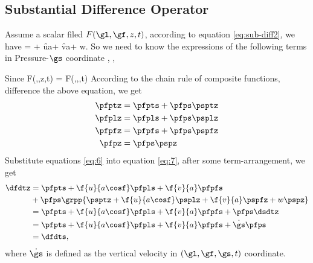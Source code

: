 \subsection{Substantial Difference Operator} \label{der:ddt-sig}

Assume a scalar filed $F(\gl,\gf,z,t)$, according to equation
\ref{eq:sub-diff2}, we have
\beeq \label{eq:7}
\dfdtz = \pfptz + \f{u}{a\cosf}\pfplz + \f{v}{a}\pfpfz + w\pfpz.
\eneq
So we need to know the expressions of the following terms in Pressure-$\gs$
coordinate
\beeq
  \pfptz, \pfplz, \pfpfz
\eneq

Since
\beeq
F(\gl,\gf,z,t) = F(\gl,\gf,\gs,t)
\eneq
According to the chain rule of composite functions, difference the above
equation, we get
\bese
\begin{align} \label{eq:6}
\pfptz &= \pfpts + \pfps\psptz\\
\pfplz &= \pfpls + \pfps\psplz\\
\pfpfz &= \pfpfs + \pfps\pspfz\\
 \pfpz &= \pfps \pspz
\end{align}
\ense
Substitute equations \ref{eq:6} into equation \ref{eq:7}, after some term-arrangement, we get
\begin{align}
  \dfdtz &= \pfpts + \f{u}{a\cosf}\pfpls + \f{v}{a}\pfpfs \nonumber\\
         & + \pfps \grpp{ \psptz + \f{u}{a\cosf}\psplz + \f{v}{a}\pspfz + w\pspz
}\nonumber\\
         &= \pfpts + \f{u}{a\cosf}\pfpls + \f{v}{a}\pfpfs + \pfps \dsdtz
\nonumber \\
         &= \pfpts + \f{u}{a\cosf}\pfpls + \f{v}{a}\pfpfs + \dot{\gs}\pfps
\nonumber \\
         &= \dfdts,
\end{align}
where $\dot{\gs}$ is defined as the vertical velocity in $(\gl,\gf,\gs,t)$
coordinate.
